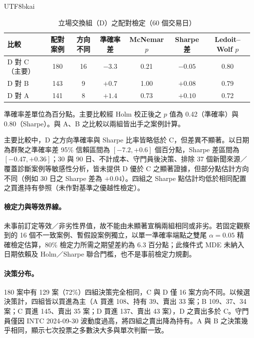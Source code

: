 \documentclass[12pt,a4paper]{article}
\newcommand{\grp}[1]{\textsf{#1}}
\begin{document}
\begin{CJK}{UTF8}{bkai}
\begin{table}[H]
\centering\small
\caption{立場交換組（\grp{D}）之配對檢定（60 個交易日）}
\label{tab:tests}
\begin{tabular}{@{}lcccccc@{}}
\toprule
比較 & 配對案例 & 方向不同 & 準確率差 & McNemar $p$ & Sharpe 差 & Ledoit--Wolf $p$ \\
\midrule
\grp{D} 對 \grp{C}（主要） & 180 & 16 & $-3.3$ & 0.21 & $-0.05$ & 0.80 \\
\grp{D} 對 \grp{B} & 143 & 9 & $+0.7$ & 1.00 & $+0.08$ & 0.79 \\
\grp{D} 對 \grp{A} & 141 & 8 & $+1.4$ & 0.73 & $+0.10$ & 0.72 \\
\bottomrule
\end{tabular}
\par\smallskip
\raggedright\footnotesize 準確率差單位為百分點。主要比較經 Holm 校正後之 $p$ 值為 0.42（準確率）與 0.80（Sharpe）。與 \grp{A}、\grp{B} 之比較以兩組皆出手之案例計算。
\end{table}

主要比較中，\grp{D} 之方向準確率與 Sharpe 比率皆略低於 \grp{C}，但差異不顯著。以日期為群聚之準確率差 95\% 信賴區間為 $[-7.2, +0.6]$ 個百分點，Sharpe 差區間為 $[-0.47,+0.36]$；30 與 90 日、不計成本、守門員後決策、排除 37 個新聞來源／覆蓋診斷案例等敏感性分析，皆未提供 \grp{D} 優於 \grp{C} 之顯著證據，但部分點估計方向不同（例如 30 日之 Sharpe 差為 $+0.04$）。四組之 Sharpe 點估計均低於相同配置之買進持有參照（未作對基準之優越性檢定）。

\paragraph{檢定力與等效界線。} 未事前訂定等效／非劣性界值，故不能由未顯著宣稱兩組相同或非劣。若固定觀察到的 16 個不一致案例、暫假設案例獨立，以單一準確率端點之雙尾 $\alpha=0.05$ 精確檢定估算，80\% 檢定力所需之期望差約為 6.3 百分點；此條件式 MDE 未納入日期依賴及 Holm／Sharpe 聯合門檻，也不是事前檢定力規劃。

\paragraph{決策分布。} 180 案中有 129 案（72\%）四組決策完全相同，\grp{C} 與 \grp{D} 僅 16 案方向不同。以候選決策計，四組皆以買進為主（\grp{A} 買進 108、持有 39、賣出 33 案；\grp{B} 109、37、34 案；\grp{C} 買進 145、賣出 35 案；\grp{D} 買進 137、賣出 43 案），\grp{D} 之賣出多於 \grp{C}。守門員僅因 INTC 2024-09-30 波動度過高，將四組之賣出降為持有。\grp{A} 與 \grp{B} 之決策幾乎相同，顯示七次投票之多數決大多與單次判斷一致。

\end{CJK}
\end{document}
